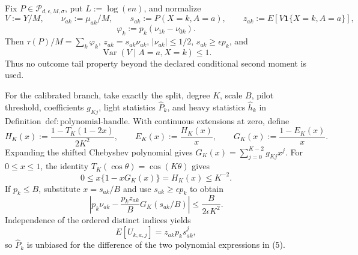 Fix \(P\in\mathcal P_{d,\epsilon,M,\sigma}\), put \(L:=\log(en)\), and normalize
\[
 V:=Y/M,\qquad \nu_{ak}:=\mu_{ak}/M,\qquad
 s_{ak}:=P(X=k,A=a),\qquad
 z_{ak}:=E[V\mathbf1\{X=k,A=a\}],
\]
\[
 \varphi_k:=p_k(\nu_{1k}-\nu_{0k}).
\tag{1}
\]
Then \(\tau(P)/M=\sum_k\varphi_k\), \(z_{ak}=s_{ak}\nu_{ak}\), \(|\nu_{ak}|\le1/2\), \(s_{ak}\ge\epsilon p_k\), and
\[
 \operatorname{Var}(V\mid A=a,X=k)\le1.
\tag{2}
\]
Thus no outcome tail property beyond the declared conditional second moment is used.

For the calibrated branch, take exactly the split, degree \(K\), scale \(B\), pilot threshold, coefficients \(g_{Kj}\), light statistics \(\widehat P_k\), and heavy statistics \(\widehat h_k\) in Definition~\(\mathrm{def:polynomial\text{-}handle}\).  With continuous extensions at zero, define
\[
 H_K(x):=\frac{1-T_K(1-2x)}{2K^2},\qquad
 E_K(x):=\frac{H_K(x)}x,\qquad
 G_K(x):=\frac{1-E_K(x)}x.
\tag{3}
\]
Expanding the shifted Chebyshev polynomial gives \(G_K(x)=\sum_{j=0}^{K-2}g_{Kj}x^j\).  For \(0\le x\le1\), the identity \(T_K(\cos\theta)=\cos(K\theta)\) gives
\[
 0\le x\{1-xG_K(x)\}=H_K(x)\le K^{-2}.
\tag{4}
\]
If \(p_k\le B\), substitute \(x=s_{ak}/B\) and use \(s_{ak}\ge\epsilon p_k\) to obtain
\[
 \left|p_k\nu_{ak}-\frac{p_kz_{ak}}B G_K(s_{ak}/B)\right|
 \le\frac{B}{2\epsilon K^2}.
\tag{5}
\]
Independence of the ordered distinct indices yields
\[
 E[U_{k,a,j}]=z_{ak}p_ks_{ak}^j,
\tag{6}
\]
so \(\widehat P_k\) is unbiased for the difference of the two polynomial expressions in (5).

